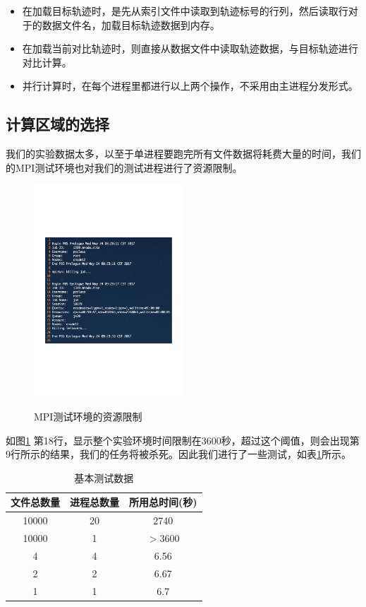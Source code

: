 \documentclass[UTF8]{ctexart}
\begin{document}
\begin{itemize}
	\item 在加载目标轨迹时，是先从索引文件中读取到轨迹标号的行列，然后读取行对于的数据文件名，加载目标轨迹数据到内存。
	\item 在加载当前对比轨迹时，则直接从数据文件中读取轨迹数据，与目标轨迹进行对比计算。
	\item 并行计算时，在每个进程里都进行以上两个操作，不采用由主进程分发形式。
\end{itemize}

\subsection{计算区域的选择}
\label{sec3:subsec2}
我们的实验数据太多，以至于单进程要跑完所有文件数据将耗费大量的时间，我们的MPI测试环境也对我们的测试进程进行了资源限制。

\begin{figure}[!htbp]
  \centering
  \includegraphics[width=0.5\textwidth]{fig/fig02.pdf}\\
  \caption{MPI测试环境的资源限制}
  \label{sec3:subsec2:fg1}
\end{figure}

如图\ref{sec3:subsec2:fg1}
第18行，显示整个实验环境时间限制在3600秒，超过这个阈值，则会出现第9行所示的结果，我们的任务将被杀死。因此我们进行了一些测试，如表\ref{sec3:subsec2:tb1}所示。

\begin{table}[!htbp]
  \centering
  \caption{基本测试数据}\label{sec3:subsec2:tb1}
  \begin{tabular}{c|c|c}
    \hline
    文件总数量 & 进程总数量  & 所用总时间(秒) \\
    \hline
    10000 & 20 & 2740 \\
    \hline
    10000 & 1 & $>$3600 \\
    \hline
    4 & 4 & 6.56 \\
    \hline
    2 & 2 & 6.67 \\
    \hline
    1 & 1 & 6.7 \\
    \hline
  \end{tabular}
\end{table}
\end{document}
